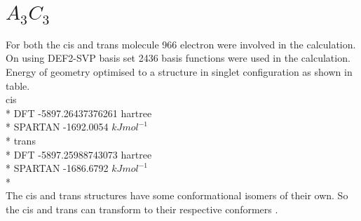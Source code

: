 \documentclass{article}
\begin{document}
\section{\(A_{3}C_{3}\)}
    For both the cis and trans molecule 966 electron were involved in the calculation. On using DEF2-SVP basis set 2436 basis functions were used in the calculation. Energy of geometry optimised to a structure in singlet configuration as shown in table.\\
    cis\\*
    DFT     -5897.26437376261 hartree\\*
    SPARTAN -1692.0054  \(kJmol^{-1}\)\\*
    trans\\*
    DFT     -5897.25988743073 hartree\\*
    SPARTAN -1686.6792 \(kJmol^{-1}\)\\*\\
    The cis and trans structures have some conformational isomers of their own. So the cis and trans can transform to their respective conformers .
\end{document}
